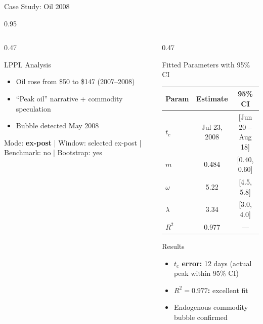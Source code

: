 \documentclass[9pt, aspectratio=169, t]{beamer}
\begin{document}
\begin{frame}{Case Study: Oil 2008}
\begin{cminipage}{0.95\textwidth}
{\begin{columns}[T]
\begin{column}{0.47\textwidth}
            \begin{exampleblock}{LPPL Analysis}
                \begin{itemize}\setlength{\itemsep}{0pt}
                    \item Oil rose from \$50 to \$147 (2007--2008)
                    \item ``Peak oil'' narrative + commodity speculation
                    \item Bubble detected May 2008
                \end{itemize}
            \end{exampleblock}
            \vspace{-2mm}
            {\scriptsize\textcolor{MediumGray}{Mode: \textbf{ex-post} | Window: selected ex-post | Benchmark: no | Bootstrap: yes}}
        \end{column}
        \begin{column}{0.47\textwidth}
            \begin{alertblock}{Fitted Parameters with 95\% CI}
                \begin{center}
                    \begin{tabular}{lcc}
                        \toprule
                        \textbf{Param} & \textbf{Estimate} & \textbf{95\% CI} \\
                        \midrule
                        $t_c$ & Jul 23, 2008 & [Jun 20 -- Aug 18] \\
                        $m$ & 0.484 & [0.40, 0.60] \\
                        $\omega$ & 5.22 & [4.5, 5.8] \\
                        $\lambda$ & 3.34 & [3.0, 4.0] \\
                        $R^2$ & 0.977 & --- \\
                        \bottomrule
                    \end{tabular}
                \end{center}
            \end{alertblock}

            \begin{exampleblock}{Results}
                \begin{itemize}\setlength{\itemsep}{0pt}
                    \item \textbf{$t_c$ error:} 12 days (actual peak within 95\% CI)
                    \item \textbf{$R^2 = 0.977$:} excellent fit
                    \item Endogenous commodity bubble confirmed
                \end{itemize}
            \end{exampleblock}
        \end{column}
    \end{columns}
    }
    \end{cminipage}
\end{frame}
\end{document}
